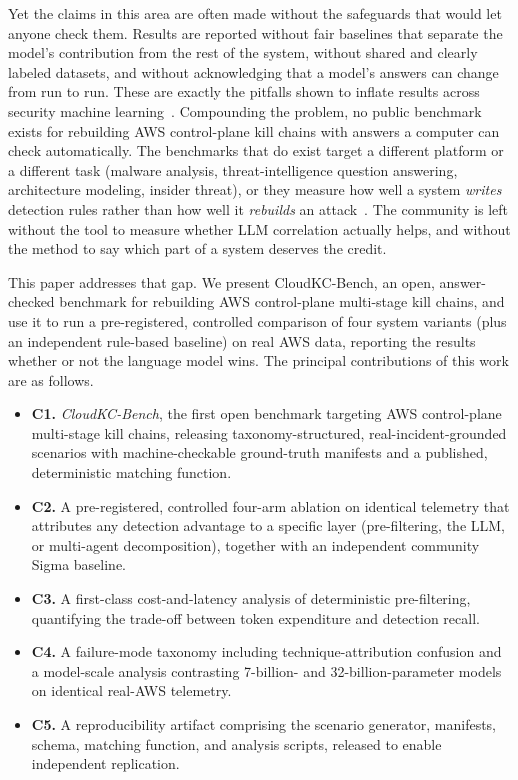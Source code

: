 \documentclass[journal]{IEEEtran}
\begin{document}
Yet the claims in this area are often made without the safeguards that would let anyone check them.
Results are reported without fair baselines that separate the model's contribution from the rest of the
system, without shared and clearly labeled datasets, and without acknowledging that a model's answers
can change from run to run. These are exactly the pitfalls shown to inflate results across security
machine learning~\cite{arp22}. Compounding the problem, no public benchmark exists for rebuilding AWS
control-plane kill chains with answers a computer can check automatically. The benchmarks that do exist
target a different platform or a different task (malware analysis, threat-intelligence question
answering, architecture modeling, insider threat), or they measure how well a system \emph{writes}
detection rules rather than how well it \emph{rebuilds} an attack~\cite{cybersoceval, excytin, orgforge,
acseeval}. The community is left without the tool to measure whether LLM correlation actually helps, and
without the method to say which part of a system deserves the credit.

This paper addresses that gap. We present CloudKC-Bench, an open, answer-checked benchmark for
rebuilding AWS control-plane multi-stage kill chains, and use it to run a pre-registered, controlled
comparison of four system variants (plus an independent rule-based baseline) on real AWS data,
reporting the results whether or not the language model wins. The principal contributions of
this work are as follows.

\begin{itemize}
\item \textbf{C1.} \emph{CloudKC-Bench}, the first open benchmark targeting AWS control-plane
multi-stage kill chains, releasing taxonomy-structured, real-incident-grounded scenarios with
machine-checkable ground-truth manifests and a published, deterministic matching function.
\item \textbf{C2.} A pre-registered, controlled four-arm ablation on identical telemetry that
attributes any detection advantage to a specific layer (pre-filtering, the LLM, or multi-agent
decomposition), together with an independent community Sigma baseline.
\item \textbf{C3.} A first-class cost-and-latency analysis of deterministic pre-filtering,
quantifying the trade-off between token expenditure and detection recall.
\item \textbf{C4.} A failure-mode taxonomy including technique-attribution confusion and a
model-scale analysis contrasting 7-billion- and 32-billion-parameter models on identical real-AWS
telemetry.
\item \textbf{C5.} A reproducibility artifact comprising the scenario generator, manifests, schema,
matching function, and analysis scripts, released to enable independent replication.
\end{itemize}
\end{document}
